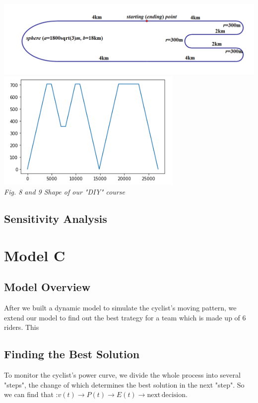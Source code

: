 \documentclass[12pt]{article}
\theoremstyle{definition}
\theoremstyle{remark}
\numberwithin{equation}{section}
\begin{document}
	\begin{center}
		\includegraphics[width=15cm]{8.png}\\
		\includegraphics[width=9cm]{9.png}\\
		\small \textit{Fig. 8 and 9  Shape of our "DIY" course }
	\end{center}
	\subsection{Sensitivity Analysis}
	\section{Model C}
	\subsection{Model Overview}
	After we built a dynamic model to simulate the cyclist's moving pattern, we extend our model to find out the best trategy for a team which is made up of 6 riders. This 
	\subsection{Finding the Best Solution}
	To monitor the cyclist's power curve, we divide the whole process into several "steps", the change of which determines the best solution in the next "step". So we can find that :$v(t)\rightarrow P(t)\rightarrow E(t)\rightarrow \mathrm{next\, decision}$.
\end{document}
